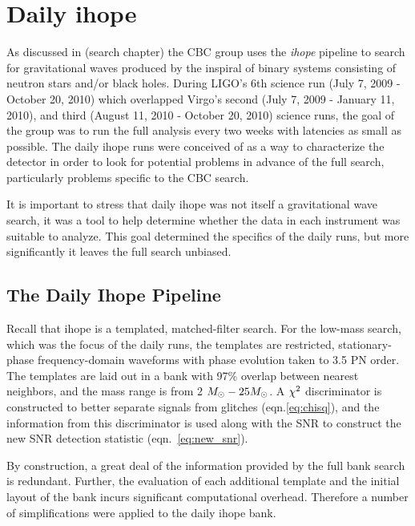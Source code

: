 \section{Daily ihope}

As discussed in (search chapter) the CBC group uses the \emph{ihope}
pipeline to search for gravitational waves produced by the inspiral of
binary systems consisting of neutron stars and/or black holes.  During
LIGO's 6th science run (July 7, 2009 - October 20, 2010) which
overlapped Virgo's second (July 7, 2009 - January 11, 2010), and third
(August 11, 2010 - October 20, 2010) science runs, the goal of the
group was to run the full analysis every two weeks with latencies as
small as possible.  The daily ihope runs were conceived of as a way to
characterize the detector in order to look for potential problems in
advance of the full search, particularly problems specific to the CBC
search.

It is important to stress that daily ihope was not itself a
gravitational wave search, it was a tool to help determine whether the
data in each instrument was suitable to analyze.  This goal determined
the specifics of the daily runs, but more significantly it leaves the
full search unbiased.

\subsection{The Daily Ihope Pipeline}

Recall that ihope is a templated, matched-filter search.  For the
low-mass search, which was the focus of the daily runs, the templates
are restricted, stationary-phase frequency-domain waveforms with phase
evolution taken to 3.5 PN order.  The templates are laid out in a bank
with 97\% overlap between nearest neighbors, and the mass range is
from 2 $M_\odot - 25 M_\odot$.  A $\chi^2$ discriminator is constructed to
better separate signals from glitches (eqn.\ref{eq:chisq}), and the
information from this discriminator is used along with the SNR to
construct the new SNR detection statistic (eqn.~\ref{eq:new_snr}).

By construction, a great deal of the information provided by
the full bank search is redundant.  Further, the evaluation of each
additional template and the initial layout of the bank incurs
significant computational overhead.  Therefore a number of
simplifications were applied to the daily ihope bank.

